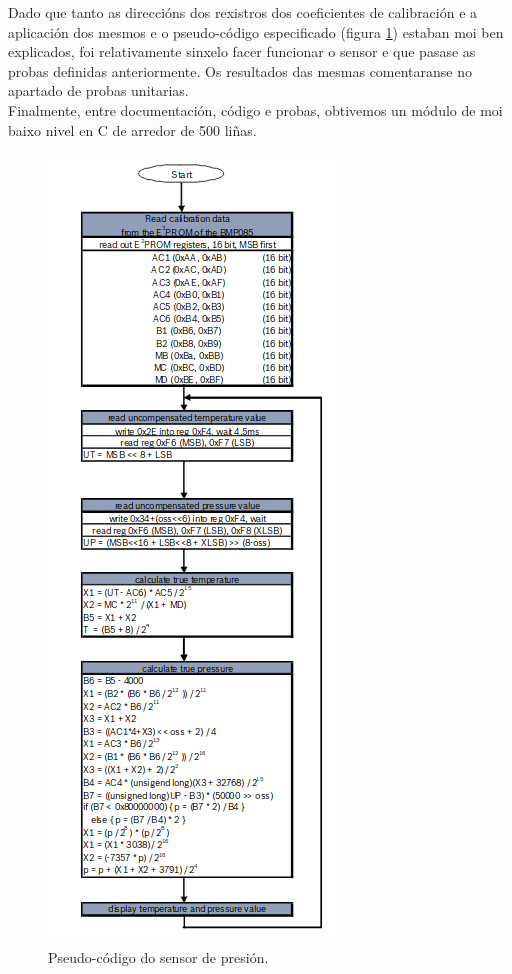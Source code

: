    Dado que tanto as direccións dos rexistros dos coeficientes de calibración e
   a aplicación dos mesmos e o pseudo-código especificado (figura 
   \ref{figura:Bmp085PseudoCodigo}) estaban moi ben explicados, foi relativamente
   sinxelo facer funcionar o sensor e que pasase as probas definidas
   anteriormente. Os resultados das mesmas comentaranse no apartado de probas
   unitarias. \\
   
   Finalmente, entre documentación, código e probas, obtivemos un módulo de moi
   baixo nivel en C de arredor de 500 liñas. \\
   
   \begin{figure}[htbp]
    \centering
    \includegraphics[scale=0.6, keepaspectratio=true]{./imagenes/bmp085-pseudocodigo.png}
    \caption{Pseudo-código do sensor de presión.}
    \label{figura:Bmp085PseudoCodigo}
   \end{figure}
   
